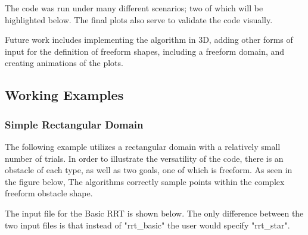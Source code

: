 		The code was run under many different scenarios; two of which will be highlighted below. The final plots also serve to validate the code visually. 
		
		Future work includes implementing the algorithm in 3D, adding other forms of input for the definition of freeform shapes, including a freeform domain, and creating animations of the plots. 
	
	\subsection{Working Examples}
		\subsubsection{Simple Rectangular Domain}
		
		The following example utilizes a rectangular domain with a relatively small number of trials. In order to illustrate the versatility of the code, there is an obstacle of each type, as well as two goals, one of which is freeform. As seen in the figure below, The algorithms correctly sample points within the complex freeform obstacle shape.   
		
		The input file for the Basic RRT is shown below. The only difference between the two input files is that instead of "rrt\_basic" the user would specify "rrt\_star".
		
		
		
		
